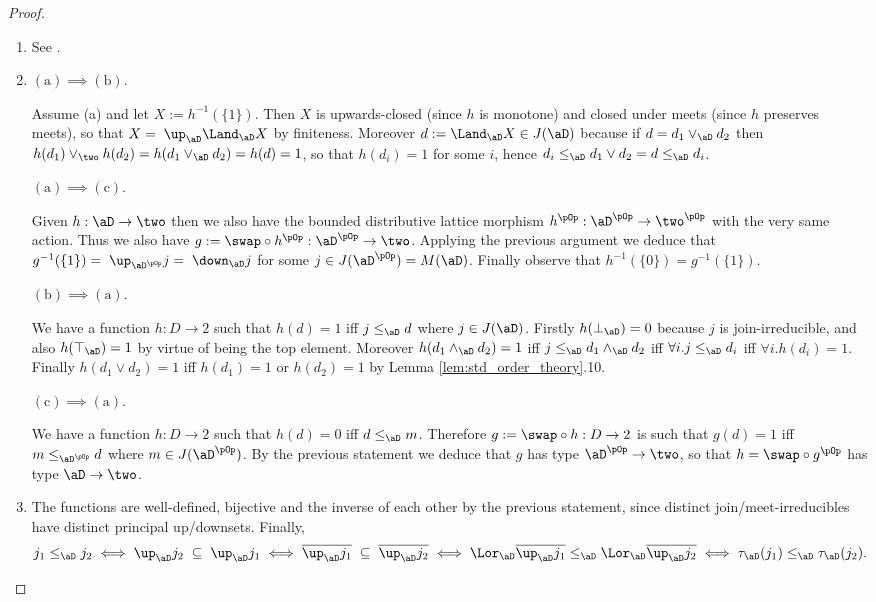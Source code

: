 \documentclass{article}
\begin{document}
\begin{proof}
\begin{enumerate}
\begin{enumerate}[(i)]
\end{enumerate}

\item
See \cite[Chapter II, Theorem 1]{GratzerGeneralLattice1998}.

\item
$\mathrm{(a)} \implies \mathrm{(b)}$.

Assume (a) and let $X := h^{-1}(\{1\})$. Then $X$ is upwards-closed (since $h$ is monotone) and closed under meets (since $h$ preserves meets), so that  $X = \; \up_\aD \Land_\aD X$ by finiteness. Moreover $d := \Land_\aD X \in J(\aD)$ because if $d = d_1 \lor_\aD d_2$ then $h(d_1) \lor_\two h(d_2) = h(d_1 \lor_\aD d_2) = h(d) = 1$, so that $h(d_i) = 1$ for some $i$, hence $d_i \leq_\aD d_1 \lor d_2 = d \leq_\aD d_i$.

\smallskip
$\mathrm{(a)} \implies \mathrm{(c)}$.

Given $h : \aD \to \two$ then we also have the bounded distributive lattice morphism $h^{\pOp} : \aD^{\pOp} \to \two^{\pOp}$ with the very same action. Thus we also have $g := \swap \circ h^{\pOp} : \aD^{\pOp} \to \two$. Applying the previous argument we deduce that $g^{-1}(\{1\}) = \; \up_{\aD^{\pOp}} j = \; \down_\aD j$ for some $j \in J(\aD^{\pOp}) = M(\aD)$. Finally observe that $h^{-1}(\{0\}) = g^{-1}(\{1\})$.


\smallskip
$\mathrm{(b)} \implies \mathrm{(a)}$.

We have a function $h : D \to 2$ such that $h(d) = 1$ iff $j \leq_\aD d$ where $j \in J(\aD)$. Firstly $h(\bot_\aD) = 0$ because $j$ is join-irreducible, and also $h(\top_\aD) = 1$ by virtue of being the top element. Moreover $h(d_1 \land_\aD d_2) = 1$ iff $j \leq_\aD d_1 \land_\aD d_2$ iff $\forall i.j \leq_\aD d_i$ iff $\forall i. h(d_i) = 1$. Finally $h(d_1 \lor d_2) = 1$ iff $h(d_1) = 1$ or $h(d_2) = 1$ by Lemma \ref{lem:std_order_theory}.10. 

\smallskip
$\mathrm{(c)} \implies \mathrm{(a)}$.

We have a function $h : D \to 2$ such that $h(d) = 0$ iff $d \leq_\aD m$. Therefore $g := \swap \circ h : D \to 2$ is such that $g(d) = 1$ iff $m \leq_{\aD^{\pOp}} d$ where $m \in J(\aD^{\pOp})$. By the previous statement we deduce that $g$ has type $\aD^{\pOp} \to \two$, so that $h = \swap \circ g^{\pOp}$ has type $\aD \to \two$.

\item
The functions are well-defined, bijective and the inverse of each other by the previous statement, since distinct join/meet-irreducibles have distinct principal up/downsets. Finally,
\[
j_1 \leq_\aD j_2
\iff \up_\aD j_2 \; \subseteq \; \up_\aD j_1
\iff \overline{\up_\aD j_1} \; \subseteq \; \overline{\up_\aD j_2}
\iff \Lor_\aD \overline{\up_\aD j_1} \leq_\aD \Lor_\aD \overline{\up_\aD j_2}
\iff \tau_\aD(j_1) \leq_\aD \tau_\aD(j_2).
\]


\end{enumerate}
\end{proof}
\end{document}
